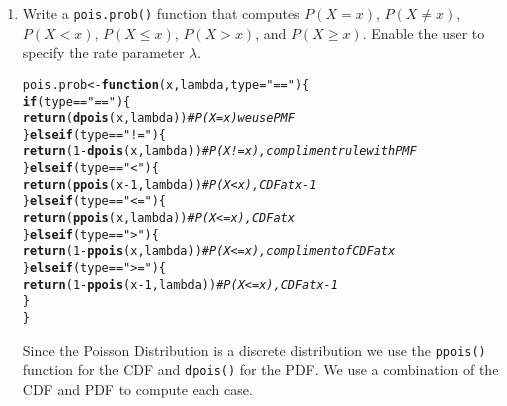 \documentclass{article}\usepackage[]{graphicx}\usepackage[]{xcolor}
\makeatletter
\newcommand{\hlnum}[1]{\textcolor[rgb]{0.686,0.059,0.569}{#1}}%
\newcommand{\hlsng}[1]{\textcolor[rgb]{0.192,0.494,0.8}{#1}}%
\newcommand{\hlcom}[1]{\textcolor[rgb]{0.678,0.584,0.686}{\textit{#1}}}%
\newcommand{\hlopt}[1]{\textcolor[rgb]{0,0,0}{#1}}%
\newcommand{\hldef}[1]{\textcolor[rgb]{0.345,0.345,0.345}{#1}}%
\newcommand{\hlkwa}[1]{\textcolor[rgb]{0.161,0.373,0.58}{\textbf{#1}}}%
\newcommand{\hlkwb}[1]{\textcolor[rgb]{0.69,0.353,0.396}{#1}}%
\newcommand{\hlkwc}[1]{\textcolor[rgb]{0.333,0.667,0.333}{#1}}%
\newcommand{\hlkwd}[1]{\textcolor[rgb]{0.737,0.353,0.396}{\textbf{#1}}}%
\newenvironment{kframe}{%
 \def\at@end@of@kframe{}%
 \ifinner\ifhmode%
  \def\at@end@of@kframe{\end{minipage}}%
  \begin{minipage}{\columnwidth}%
 \fi\fi%
 \def\FrameCommand##1{\hskip\@totalleftmargin \hskip-\fboxsep
 \colorbox{shadecolor}{##1}\hskip-\fboxsep
     \hskip-\linewidth \hskip-\@totalleftmargin \hskip\columnwidth}%
 \MakeFramed {\advance\hsize-\width
   \@totalleftmargin\z@ \linewidth\hsize
   \@setminipage}}%
 {\par\unskip\endMakeFramed%
 \at@end@of@kframe}
\newenvironment{knitrout}{}{} %
\makeatother
\begin{document}
  \begin{enumerate}
    \item Write a \texttt{pois.prob()} function that computes $P(X=x)$, 
    $P(X \neq x)$, $P(X<x)$, $P(X \leq x)$, $P(X > x)$, and $P(X \geq x).$ Enable the user to specify the rate parameter $\lambda$.
\begin{knitrout}\scriptsize
{}\color{fgcolor}\begin{kframe}
\begin{alltt}
  \hldef{pois.prob} \hlkwb{<-} \hlkwa{function}\hldef{(}\hlkwc{x}\hldef{,} \hlkwc{lambda}\hldef{,} \hlkwc{type}\hldef{=} \hlsng{"=="}\hldef{)\{}
  \hlkwa{if}\hldef{(type} \hlopt{==} \hlsng{"=="}\hldef{)\{}
    \hlkwd{return}\hldef{(}\hlkwd{dpois}\hldef{(x, lambda))} \hlcom{#P(X=x) we use PMF}
  \hldef{\}}\hlkwa{else if}\hldef{(type} \hlopt{==} \hlsng{"!="}\hldef{)\{}
    \hlkwd{return}\hldef{(}\hlnum{1}\hlopt{-}\hlkwd{dpois}\hldef{(x, lambda))} \hlcom{#P(X!=x), compliment rule with PMF}
  \hldef{\}}\hlkwa{else if}\hldef{(type} \hlopt{==} \hlsng{"<"}\hldef{)\{}
    \hlkwd{return}\hldef{(}\hlkwd{ppois}\hldef{(x}\hlopt{-}\hlnum{1}\hldef{, lambda))} \hlcom{#P(X<x), CDF at x-1}
  \hldef{\}}\hlkwa{else if}\hldef{(type} \hlopt{==} \hlsng{"<="}\hldef{)\{}
    \hlkwd{return}\hldef{(}\hlkwd{ppois}\hldef{(x, lambda))} \hlcom{#P(X<=x), CDF at x}
  \hldef{\}}\hlkwa{else if}\hldef{(type} \hlopt{==} \hlsng{">"}\hldef{)\{}
    \hlkwd{return}\hldef{(}\hlnum{1}\hlopt{-}\hlkwd{ppois}\hldef{(x, lambda))} \hlcom{#P(X<=x), compliment of CDF at x}
  \hldef{\}}\hlkwa{else if}\hldef{(type} \hlopt{==} \hlsng{">="}\hldef{)\{}
    \hlkwd{return}\hldef{(}\hlnum{1}\hlopt{-}\hlkwd{ppois}\hldef{(x}\hlopt{-}\hlnum{1}\hldef{, lambda))} \hlcom{#P(X<=x), CDF at x-1}
  \hldef{\}}
\hldef{\}}
\end{alltt}
\end{kframe}
\end{knitrout}
Since the Poisson Distribution is a discrete distribution we use the \verb|ppois()| function for the CDF and \verb|dpois()| for the PDF. We use a combination of the CDF and PDF to compute each case. 


\end{enumerate}
\end{document}
